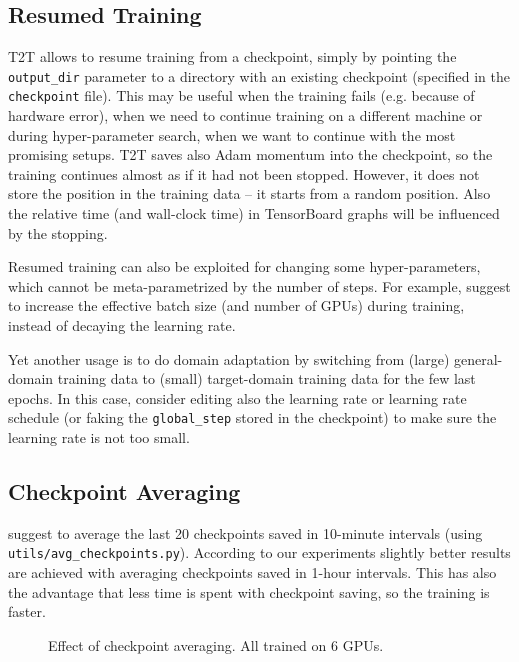 \documentclass{pbmlarxiv} \pdfoutput=1
\begin{document}
\subsection{Resumed Training}\label{sec:resumed-training}
T2T allows to resume training from a checkpoint,
 simply by pointing the \verb|output_dir| parameter to a directory
 with an existing checkpoint (specified in the \verb|checkpoint| file).
This may be useful when the training fails (e.g. because of hardware error),
 when we need to continue training on a different machine
 or during hyper-parameter search,
 when we want to continue with the most promising setups.
T2T saves also Adam momentum into the checkpoint,
 so the training continues almost as if it had not been stopped.
However, it does not store the position in the training data
 -- it starts from a random position.
Also the relative time (and wall-clock time) in TensorBoard graphs
 will be influenced by the stopping.

Resumed training can also be exploited for changing some hyper-parameters,
 which cannot be meta-parametrized by the number of steps.
For example, \citet{smith:etal:lr:batchsize:arxiv:2017} suggest
 to increase the effective batch size (and number of GPUs) during training,
 instead of decaying the learning rate.

Yet another usage is to do domain adaptation
 by switching from (large) general-domain training data
 to (small) target-domain training data
 for the few last epochs.
In this case, consider editing also the learning rate or learning rate schedule
 (or faking the \verb|global_step| stored in the checkpoint)
 to make sure the learning rate is not too small.

\subsection{Checkpoint Averaging}\label{sec:averaging}
\citet{vaswani-et-al:2017} suggest to average the last 20 checkpoints saved in 10-minute intervals
 (using \verb|utils/avg_checkpoints.py|).
According to our experiments slightly better results are achieved
 with averaging checkpoints saved in 1-hour intervals.
This has also the advantage that less time is spent with checkpoint saving, so the training is faster.

\begin{figure}
\vspace{-5mm}
\caption{Effect of checkpoint averaging. All trained on 6 GPUs.}
\label{fig:averaging}
\end{figure}
\end{document}
